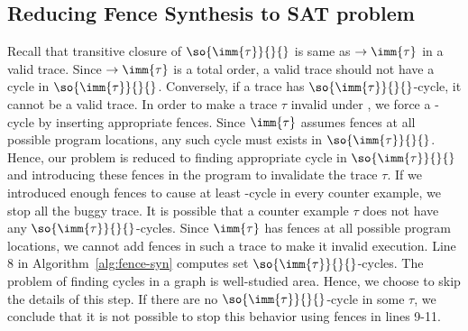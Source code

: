 \subsection{Reducing Fence Synthesis to SAT problem}
Recall that transitive closure of $ \so{\imm{\tau}}{}{} $ is same as 
$ \to{\imm{\tau}}{}{} $ in a valid \cc trace. Since  
$ \to{\imm{\tau}}{}{} $ is a total order, a valid \cc trace should not 
have a cycle in $ \so{\imm{\tau}}{}{} $. Conversely, if a trace has 
$ \so{\imm{\tau}}{}{} $-cycle, it cannot be a valid \cc trace. 
In order to make a trace $ \tau $ invalid under \cc, we force a \lso-cycle by inserting appropriate fences. 
Since $ \imm{\tau} $ assumes \mosc fences at all possible program locations,
any such cycle must exists in $ \so{\imm{\tau}}{}{} $. 
Hence, our problem is reduced to finding appropriate cycle in 
$\so{\imm{\tau}}{}{} $ and introducing these fences in the program to 
invalidate the trace $ \tau $.
If we introduced enough fences to cause at least \lso-cycle in 
every counter example, we stop all the buggy trace. 
It is possible that a counter example $ \tau $ does not have any 
$\so{\imm{\tau}}{}{}$-cycles. Since $ \imm{\tau} $ has \mosc fences at all 
possible program locations, we cannot add fences in such a trace to 
make it invalid \cc execution. 
Line 8 in Algorithm~\ref{alg:fence-syn} computes set $\so{\imm{\tau}}{}{}$-cycles. 
The problem of finding cycles in a graph is well-studied area. Hence, we 
choose to skip the details of this step.
If there are no $\so{\imm{\tau}}{}{}$-cycle in some $ \tau $, we conclude 
that it is not possible to stop this behavior using \cc fences in lines 
9-11.


